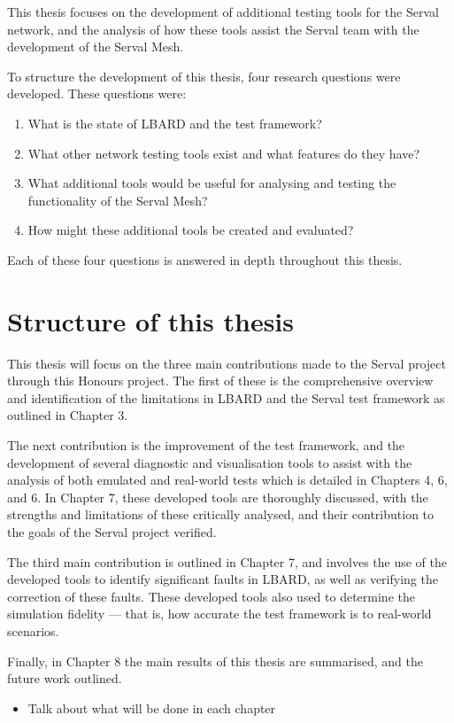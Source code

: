This thesis focuses on the development of additional testing tools for the Serval network, and the analysis of how these tools assist the Serval team with the development of the Serval Mesh.


To structure the development of this thesis, four research questions were developed.
These questions were:
\begin{enumerate}
    \item What is the state of LBARD and the test framework?
    \item What other network testing tools exist and what features do they have?
    \item What additional tools would be useful for analysing and testing the functionality of the Serval Mesh?
    \item How might these additional tools be created and evaluated?
\end{enumerate}
Each of these four questions is answered in depth throughout this thesis.


\section{Structure of this thesis}

This thesis will focus on the three main contributions made to the Serval project through this Honours project.
The first of these is the comprehensive overview and identification of the limitations in LBARD and the Serval test framework as outlined in Chapter 3.

The next contribution is the improvement of the test framework, and the development of several diagnostic and visualisation tools to assist with the analysis of both emulated and real-world tests which is detailed in Chapters 4, 6, and 6. 
In Chapter 7, these developed tools are thoroughly discussed, with the strengths and limitations of these critically analysed, and their contribution to the goals of the Serval project verified. 

The third main contribution is outlined in Chapter 7, and involves the use of the developed tools to identify significant faults in LBARD, as well as verifying the correction of these faults.
These developed tools also used to determine the simulation fidelity — that is, how accurate the test framework is to real-world scenarios.

Finally, in Chapter 8 the main results of this thesis are summarised, and the future work outlined.


\begin{itemize}
    \item   Talk about what will be done in each chapter
\end{itemize}

